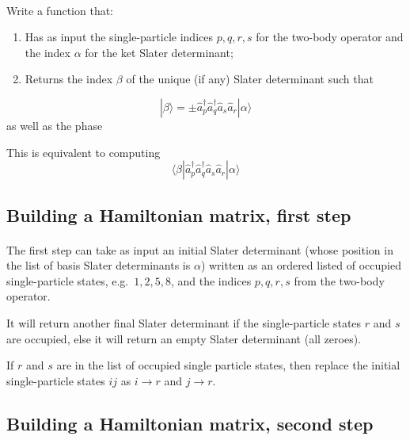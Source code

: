 \documentclass[%
oneside,                 %
final,                   %
10pt]{article}
\begin{document}
\paragraph{}
Write a function that:
\begin{enumerate}
\item Has as input the single-particle indices $p,q,r,s$ for the two-body operator and the index $\alpha$ for the ket Slater determinant;

\item Returns the index $\beta$ of the unique (if any) Slater determinant such that
\end{enumerate}

\noindent
\[
| \beta \rangle = \pm \hat{a}^\dagger_p \hat{a}^\dagger_q\hat{a}_s \hat{a}_r |\alpha \rangle
\]
as well as the phase

This is equivalent to computing
\[
\langle \beta | \hat{a}^\dagger_p \hat{a}^\dagger_q\hat{a}_s \hat{a}_r |\alpha \rangle
\]



\subsection*{Building a Hamiltonian matrix, first step}

\paragraph{}
The first step can take as input an initial Slater determinant
(whose position in the list of basis Slater determinants is $\alpha$) written as an
ordered listed of occupied single-particle states, e.g.~$1,2,5,8$, and the
indices $p,q,r,s$ from the two-body operator. 

It will return another final Slater determinant if the single-particle states $r$ and $s$ are occupied, else it will return an 
empty Slater determinant
(all zeroes). 

If $r$ and $s$ are in the list of occupied single particle states, then
replace the initial single-particle states $ij$ as $i \rightarrow r$ and $j \rightarrow r$.



\subsection*{Building a Hamiltonian matrix, second step}
\end{document}
